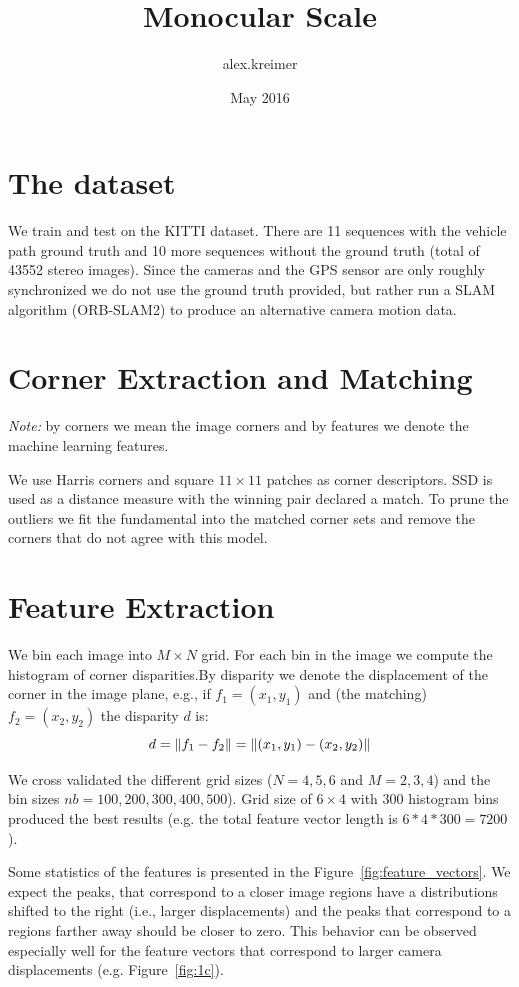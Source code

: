 \documentclass{article}
\title{Monocular Scale}
\author{alex.kreimer}
\date{May 2016}
\DeclarePairedDelimiter{\norm}{\lVert}{\rVert}
\begin{document}
\maketitle

\section{The dataset}

We train and test on the KITTI dataset. There are 11 sequences with
the vehicle path ground truth and 10 more sequences without the ground
truth (total of 43552 stereo images).  Since the
cameras and the GPS sensor are only roughly synchronized we do not use
the ground truth provided, but rather run a SLAM algorithm (ORB-SLAM2)
to produce an alternative camera motion data.

\section{Corner Extraction and Matching}

\emph{Note:} by corners we mean the image corners and by features we
denote the machine learning features.

We use Harris corners and square $11\times 11$ patches as corner
descriptors. SSD is used as a distance measure with the winning pair
declared a match.  To prune the outliers we fit the fundamental into
the matched corner sets and remove the corners that do not agree with
this model.

\section{Feature Extraction}\label{sec:features}

We bin each image into $M\times N$ grid.  For each bin in the image we
compute the histogram of corner disparities.By disparity we denote the
displacement of the corner in the image plane, e.g., if
$f_1=(x_1,y_1)$ and (the matching)
$f_2=(x_2,y_2)$ the disparity $d$ is:
\[
  d = \norm{f_1-f_2} = \norm{(x_1,y_1)-(x_2,y_2)}
\]

We cross validated the different grid sizes ($N=4,5,6$ and $M=2,3,4$)
and the bin sizes $nb=100,200,300,400,500$).  Grid size of $6\times 4$
with $300$ histogram bins produced the best results (e.g. the total
feature vector length is $6*4*300=7200$).

Some statistics of the features is presented in the
Figure~\ref{fig:feature_vectors}. We expect the peaks, that correspond
to a closer image regions have a distributions shifted to the right
(i.e., larger displacements) and the peaks that correspond to a
regions farther away should be closer to zero.  This behavior can be
observed especially well for the feature vectors that correspond to
larger camera displacements (e.g. Figure~\ref{fig:1c}).
\end{document}
